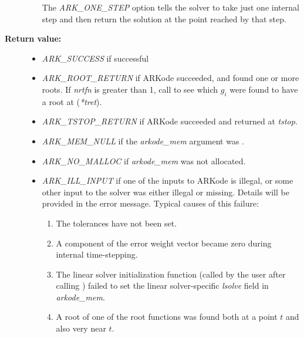 \documentclass[letterpaper,10pt,english]{sphinxmanual}
\begin{document}
\begin{fulllineitems}
\begin{description}
\begin{itemize}
The \emph{ARK\_ONE\_STEP} option tells the solver to take just one
internal step and then return the solution at the point
reached by that step.

\end{itemize}

\item[{\textbf{Return value:}}] \leavevmode\begin{itemize}
\item {} 
\emph{ARK\_SUCCESS} if successful

\item {} 
\emph{ARK\_ROOT\_RETURN} if ARKode succeeded, and found one or more roots.
If \emph{nrtfn} is greater than 1, call {\hyperref[c_interface/User_callable:ARKodeGetRootInfo]{}} to see
which $g_i$ were found to have a root at (\emph{*tret}).

\item {} 
\emph{ARK\_TSTOP\_RETURN} if ARKode succeeded and returned at \emph{tstop}.

\item {} 
\emph{ARK\_MEM\_NULL} if the \emph{arkode\_mem} argument was .

\item {} 
\emph{ARK\_NO\_MALLOC} if \emph{arkode\_mem} was not allocated.

\item {} 
\emph{ARK\_ILL\_INPUT} if one of the inputs to ARKode is illegal, or
some other input to the solver was either illegal or missing.
Details will be provided in the error message.  Typical causes
of this failure:
\begin{enumerate}
\item {} 
The tolerances have not been set.

\item {} 
A component of the error weight vector became zero during
internal time-stepping.

\item {} 
The linear solver initialization function (called by the
user after calling {\hyperref[c_interface/User_callable:ARKodeCreate]{}}) failed to set
the linear solver-specific \emph{lsolve} field in
\emph{arkode\_mem}.

\item {} 
A root of one of the root functions was found both at a
point $t$ and also very near $t$.

\end{enumerate}


\end{itemize}
\end{description}
\end{fulllineitems}
\end{document}
